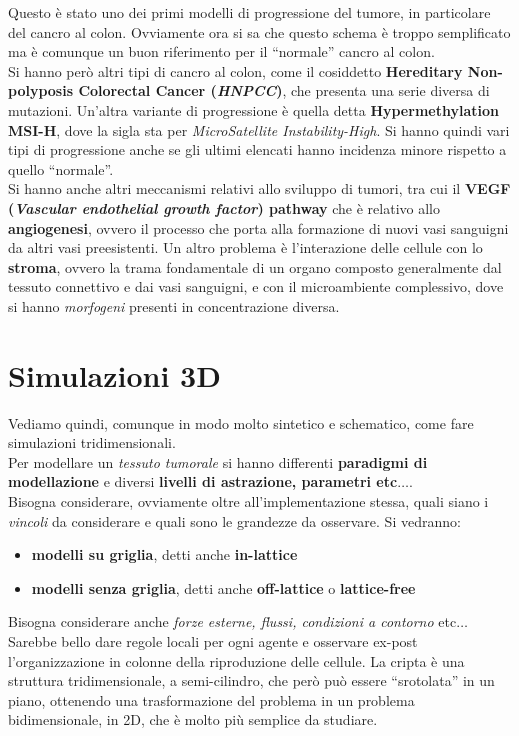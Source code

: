 \documentclass[a4paper,12pt, oneside]{book}
\begin{document}
Questo è stato uno dei primi modelli di progressione del tumore, in particolare
del cancro al colon. Ovviamente ora si sa che questo schema è troppo
semplificato ma è comunque un buon riferimento per il ``normale'' cancro al
colon.\\ 
Si hanno però altri tipi di cancro al colon, come il cosiddetto
\textbf{Hereditary Non-polyposis Colorectal Cancer (\textit{HNPCC})}, 
che presenta una serie diversa di mutazioni. Un'altra variante di progressione è
quella detta \textbf{Hypermethylation MSI-H}, dove la sigla sta per
\textit{MicroSatellite Instability-High}. Si hanno quindi vari tipi di
progressione anche se gli ultimi elencati hanno incidenza minore rispetto a
quello ``normale''.\\
Si hanno anche altri meccanismi relativi allo sviluppo di tumori, tra cui il
\textbf{VEGF (\textit{Vascular endothelial growth factor}) pathway} che è
relativo allo \textbf{angiogenesi}, ovvero il processo che porta alla formazione
di nuovi vasi sanguigni da altri vasi preesistenti. Un altro problema è
l'interazione delle cellule con lo \textbf{stroma}, ovvero la trama fondamentale
di un organo composto generalmente dal tessuto connettivo e dai vasi sanguigni,
e con il microambiente complessivo, dove si hanno \textit{morfogeni} presenti in
concentrazione diversa.
\section{Simulazioni 3D}
Vediamo quindi, comunque in modo molto sintetico e schematico, come fare
simulazioni tridimensionali. \\
Per modellare un \textit{tessuto tumorale} si hanno differenti \textbf{paradigmi
di modellazione} e diversi \textbf{livelli di astrazione, parametri
etc$\ldots$}.\\
Bisogna considerare, ovviamente oltre all'implementazione stessa, quali siano i
\textit{vincoli} da considerare e quali sono le grandezze da osservare. Si
vedranno:
\begin{itemize}
  \item \textbf{modelli su griglia}, detti anche \textbf{in-lattice}
  \item \textbf{modelli senza griglia}, detti anche \textbf{off-lattice} o
  \textbf{lattice-free} 
\end{itemize}
Bisogna considerare anche \textit{forze esterne, flussi, condizioni a contorno}
etc$\ldots$ \\
Sarebbe bello dare regole locali per ogni agente e osservare ex-post
l'organizzazione in colonne della riproduzione delle cellule. La cripta è una
struttura tridimensionale, a semi-cilindro, che però può essere ``srotolata'' in
un piano, ottenendo una trasformazione del problema in un problema
bidimensionale, in 2D, che è molto più semplice da studiare.
\end{document}
